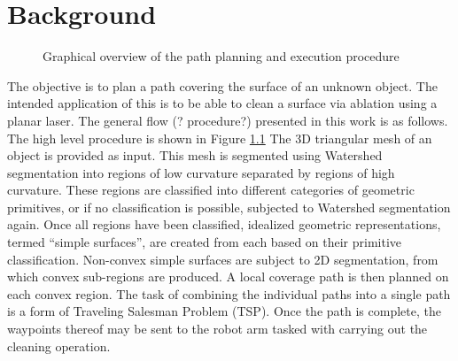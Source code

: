 \chapter{Background}

\begin{figure}[hb]
	\centering
{}
	\caption{Graphical overview of the path planning and execution procedure}
	\label{fig:bkgd_overview}
\end{figure}
The objective is to plan a path covering the surface of an unknown object.
The intended application of this is to be able to clean a surface via ablation using a planar laser.
The general flow (? procedure?) presented in this work is as follows.
The high level procedure is shown in Figure \ref{fig:bkgd_overview}
The 3D triangular mesh of an object is provided as input.
This mesh is segmented using Watershed segmentation into regions of low curvature separated by regions of high curvature.
These regions are classified into different categories of geometric primitives, or if no classification is possible, subjected to Watershed segmentation again.
Once all regions have been classified, idealized geometric representations, termed ``simple surfaces'', are created from each based on their primitive classification.
Non-convex simple surfaces are subject to 2D segmentation, from which convex sub-regions are produced.
A local coverage path is then planned on each convex region.
The task of combining the individual paths into a single path is a form of Traveling Salesman Problem (TSP).
Once the path is complete, the waypoints thereof may be sent to the robot arm tasked with carrying out the cleaning operation.

